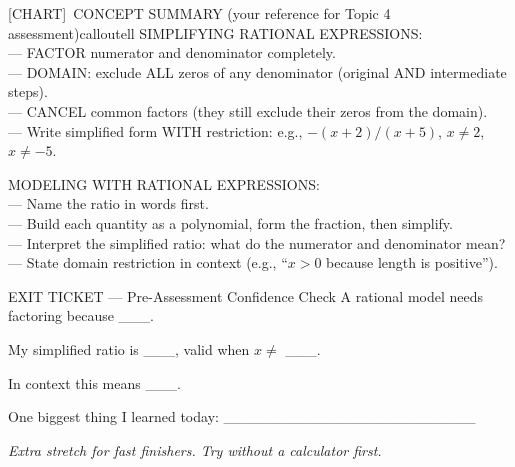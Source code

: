 \documentclass[11pt]{article}
\newcommand{\IconChart}{[CHART]}
\begin{document}
\begin{callout}{\IconChart\ CONCEPT SUMMARY (your reference for Topic 4 assessment)}{calloutell}
SIMPLIFYING RATIONAL EXPRESSIONS:\\
\hspace*{1.5em}--- FACTOR numerator and denominator completely.\\
\hspace*{1.5em}--- DOMAIN: exclude ALL zeros of any denominator (original AND intermediate steps).\\
\hspace*{1.5em}--- CANCEL common factors (they still exclude their zeros from the domain).\\
\hspace*{1.5em}--- Write simplified form WITH restriction: e.g., \(-(x+2)/(x+5)\), \(x \neq 2\), \(x \neq -5\).

\medskip
MODELING WITH RATIONAL EXPRESSIONS:\\
\hspace*{1.5em}--- Name the ratio in words first.\\
\hspace*{1.5em}--- Build each quantity as a polynomial, form the fraction, then simplify.\\
\hspace*{1.5em}--- Interpret the simplified ratio: what do the numerator and denominator mean?\\
\hspace*{1.5em}--- State domain restriction in context (e.g., ``\(x > 0\) because length is positive'').
\end{callout}


\begin{summaryexitbox}{EXIT TICKET --- Pre-Assessment Confidence Check}
A rational model needs factoring because \_\_\_.

My simplified ratio is \_\_\_, valid when \(x \neq\) \_\_\_.

In context this means \_\_\_.

One biggest thing I learned today: \_\_\_\_\_\_\_\_\_\_\_\_\_\_\_\_\_\_\_\_\_\_\_\_
\end{summaryexitbox}

\clearpage

\textit{Extra stretch for fast finishers. Try without a calculator first.}

\end{document}
